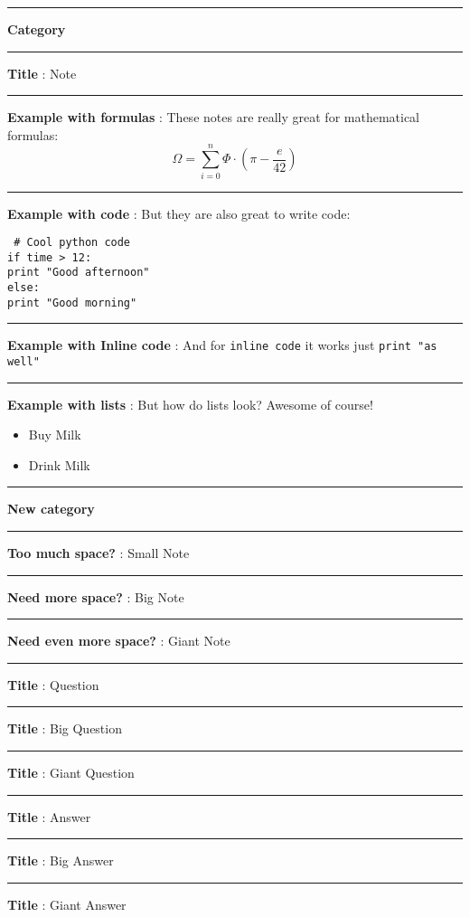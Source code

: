 \documentclass[a4paper, 10pt]{article}
\newif\ifcheat
\newcommand{\smallSize}{2in}
\newcommand{\defaultSize}{2.5in}
\newcommand{\bigSize}{3in}
\newcommand{\giantSize}{4in}
\newcommand{\currentCategory}{category}
\newcommand{\setCategory}[1]{\renewcommand{\currentCategory}{#1}}
\newcommand{\systemNote}[4]{
	\pdfpageheight=#3
	\pagecolor{#4}\afterpage{\nopagecolor}
	\rhead{\small \currentCategory}
	\subsection*{#1}
	#2
	\clearpage
}
\renewcommand{\systemNote}[4]{
	\vspace{3pt} \hrule
	\vspace{3pt}
	{\bf #1} : #2
}
\renewcommand{\setCategory}[1]{
	\vspace{3pt} \hrule
	\vspace{3pt} {\normalsize \bf #1}}
\newcommand{\snote}[2]{\systemNote{#1}{#2}{\smallSize}{noteColor}}
\newcommand{\note}[2]{\systemNote{#1}{#2}{\defaultSize}{noteColor}}
\newcommand{\bnote}[2]{\systemNote{#1}{#2}{\bigSize}{noteColor}}
\newcommand{\gnote}[2]{\systemNote{#1}{#2}{\giantSize}{noteColor}}
\newcommand{\question}[2]{\systemNote{#1}{#2}{\defaultSize}{questionColor}}
\newcommand{\bquestion}[2]{\systemNote{#1}{#2}{\bigSize}{questionColor}}
\newcommand{\gquestion}[2]{\systemNote{#1}{#2}{\giantSize}{questionColor}}
\newcommand{\answer}[2]{\systemNote{#1}{#2}{\defaultSize}{answerColor}}
\newcommand{\banswer}[2]{\systemNote{#1}{#2}{\bigSize}{answerColor}}
\newcommand{\ganswer}[2]{\systemNote{#1}{#2}{\giantSize}{answerColor}}
\newcommand{\code}[1]{\begin{mdframed}
	[backgroundcolor=codeColor, fontcolor=codeFontColor]{\tt #1}
\end{mdframed}\vspace{5pt}}
\newcommand{\cindent}{\hspace*{15pt}}
\newcommand{\incode}[1]{{\tt\colorbox{codeColor}{\color{codeFontColor}#1}}}
\begin{document}

\ifcheat
\begin{multicols}{3}
\footnotesize
\fi

\setCategory{Category}

\note{Title}{Note}

\note{Example with formulas}{
	These notes are really great for mathematical formulas:\\
	$$ \Omega = \sum_{i=0}^{n}\Phi\cdot(\pi-\frac{e}{42}) $$
}

\note{Example with code}{
	But they are also great to write code:\\
	\code{ \# Cool python code\\
		if time > 12:\\
		\cindent print "Good afternoon"\\
		else:\\
		\cindent print "Good morning"
    }
}

\snote{Example with Inline code}{
	And for \incode{inline code} it works just \incode{print "as well"}
}

\note{Example with lists}{
	But how do lists look? Awesome of course!
	\begin{itemize}
		\item Buy Milk
		\item Drink Milk
	\end{itemize}
}

\setCategory{New category}

\snote{Too much space?}{Small Note}
\bnote{Need more space?}{Big Note}
\gnote{Need even more space?}{Giant Note}
\question{Title}{Question}
\bquestion{Title}{Big Question}
\gquestion{Title}{Giant Question}
\answer{Title}{Answer}
\banswer{Title}{Big Answer}
\ganswer{Title}{Giant Answer}

\ifcheat
\end{multicols}
\fi
\end{document}
